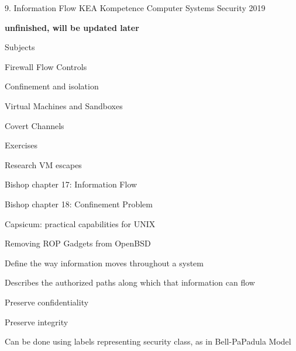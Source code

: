 \documentclass[Screen16to9,17pt]{foils}
\begin{document}
\mytitlepage
{9. Information Flow}
{KEA Kompetence Computer Systems Security 2019}


{\bf unfinished, will be updated later}


\begin{list1}
\item Subjects
\begin{list2}
\item Firewall Flow Controls
\item Confinement and isolation
\item Virtual Machines and Sandboxes
\item Covert Channels
\end{list2}
\item Exercises
\begin{list2}
\item Research VM escapes
\end{list2}
\end{list1}




\begin{list1}
\item Bishop chapter 17: Information Flow
\item Bishop chapter 18: Confinement Problem
\item Capsicum: practical capabilities for UNIX
\item Removing ROP Gadgets from OpenBSD
\end{list1}


\begin{list1}
\item Define the way information moves throughout a system
\item Describes the authorized paths along which that information can flow
\begin{list2}
\item Preserve confidentiality
\item Preserve integrity
\end{list2}
\item Can be done using labels representing security class, as in Bell-PaPadula Model
\end{list1}











\slidenext
\end{document}

